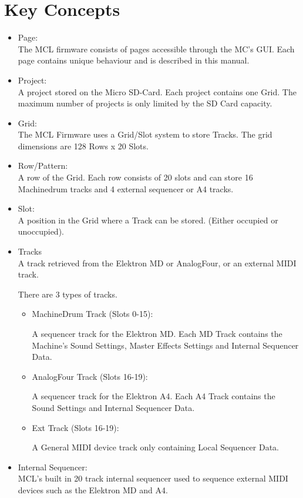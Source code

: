 \chapter{Key Concepts}

\begin{itemize}
\item Page:
\\
The MCL firmware consists of pages accessible through the MC's GUI. Each page contains unique behaviour and is described in this manual.
\item Project:
\\
A project stored on the Micro SD-Card. Each project contains one Grid. 
The maximum number of projects is only limited by the SD Card capacity.

\item Grid:
\\
The MCL Firmware uses a Grid/Slot system to store Tracks. 
The grid dimensions are 128 Rows x 20 Slots. 

\item Row/Pattern:
\\
A row of the Grid. Each row consists of 20 slots and can store 16 Machinedrum tracks and 4 external sequencer or A4 tracks. 

\item Slot:
\\
A position in the Grid where a Track can be stored. (Either occupied or unoccupied).

\item Tracks
\\
A track retrieved from the Elektron MD or AnalogFour, or an external MIDI track.

There are 3 types of tracks.
\begin{itemize}

\item MachineDrum Track (Slots 0-15):

A sequencer track for the Elektron MD. Each MD Track contains the Machine's Sound Settings, Master Effects Settings and Internal Sequencer Data.

\item AnalogFour Track (Slots 16-19):

A sequencer track for the Elektron A4. Each A4 Track contains the  Sound Settings and Internal Sequencer Data.
\item Ext Track (Slots 16-19):

A General MIDI device track only containing Local Sequencer Data.
\end{itemize}

\item Internal Sequencer:\\
MCL's built in 20 track internal sequencer used to sequence external MIDI devices such as the Elektron MD and A4.

\end{itemize}


